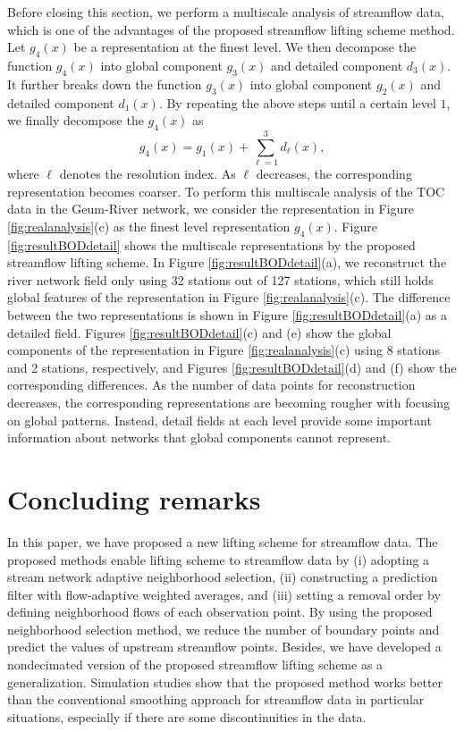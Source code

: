 \documentclass[11pt,titlepage]{article}
\begin{document}
Before closing this section, we perform a multiscale analysis of streamflow data, which is one of the advantages of the proposed streamflow lifting scheme method. Let $g_4(x)$ be a representation at the finest level. We then decompose the function $g_4(x)$ into global component $g_3(x)$ and detailed component $d_3(x)$. It further breaks down the function $g_3(x)$ into global component $g_2(x)$ and detailed component $d_1(x)$.  By repeating the above steps until a certain level $1$, we finally decompose the $g_4(x)$ as
\[
g_4(x)=g_1(x)+\sum_{\ell=1}^{3}d_\ell(x), 
\]
where $\ell$ denotes the resolution index. As $\ell$ decreases, the corresponding representation becomes coarser. To perform this multiscale analysis of the TOC data in the Geum-River network, we consider the representation in Figure \ref{fig:realanalysis}(c) as the finest level representation $g_4(x)$. Figure \ref{fig:resultBODdetail} shows the multiscale representations by the proposed streamflow lifting scheme. In Figure \ref{fig:resultBODdetail}(a), we reconstruct the river network field only using 32 stations out of 127 stations, which still holds global features of the representation in Figure \ref{fig:realanalysis}(c). The difference between the two representations is shown in Figure \ref{fig:resultBODdetail}(a) as a detailed field. Figures \ref{fig:resultBODdetail}(c) and (e) show the global components of the representation in Figure \ref{fig:realanalysis}(c) using 8 stations and 2 stations, respectively, and  Figures \ref{fig:resultBODdetail}(d) and (f) show the corresponding differences. As the number of data points for reconstruction decreases, the corresponding representations are becoming rougher with focusing on global patterns. Instead, detail fields at each level provide some important information about networks that global components cannot represent.

\section{Concluding remarks}\label{sec:streamflowsummary}

In this paper, we have proposed a new lifting scheme for streamflow data. The proposed methods enable lifting scheme to streamflow data by (i) adopting a stream network adaptive neighborhood selection, (ii) constructing a prediction filter with flow-adaptive weighted averages, and (iii) setting a removal order by defining neighborhood flows of each observation point. By using the proposed neighborhood selection method, we reduce the number of boundary points and predict the values of upstream streamflow points. Besides, we have developed a nondecimated version of the proposed streamflow lifting scheme as a generalization. Simulation studies show that the proposed method works better than the conventional smoothing approach for streamflow data in particular situations, especially if there are some discontinuities in the data.
\end{document}
